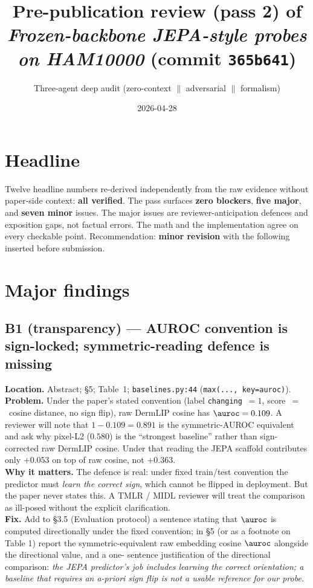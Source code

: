 \documentclass[11pt,a4paper]{article}
\title{Pre-publication review (pass 2) of \emph{Frozen-backbone JEPA-style
       probes on HAM10000} (commit \texttt{365b641})}
\author{Three-agent deep audit (zero-context $\parallel$ adversarial $\parallel$ formalism)}
\date{2026-04-28}
\begin{document}
\maketitle

\section*{Headline}

Twelve headline numbers re-derived independently from the raw evidence
without paper-side context: \textbf{all verified}. The pass surfaces
\textbf{zero blockers}, \textbf{five major}, and \textbf{seven minor}
issues. The major issues are reviewer-anticipation defences and
exposition gaps, not factual errors. The math and the implementation
agree on every checkable point. Recommendation: \textbf{minor revision}
with the following inserted before submission.

\section{Major findings}

\subsection*{B1 (transparency) --- AUROC convention is sign-locked;
            symmetric-reading defence is missing}

\textbf{Location.} Abstract; \S5; Table~1; \texttt{baselines.py:44}
(\texttt{max(...,~key=auroc)}).\\
\textbf{Problem.} Under the paper's stated convention (label
\texttt{changing}~$=1$, score~$=$~cosine distance, no sign flip), raw
DermLIP cosine has $\auroc = 0.109$. A reviewer will note that
$1 - 0.109 = 0.891$ is the symmetric-AUROC equivalent and ask why
pixel-L2 ($0.580$) is the ``strongest baseline'' rather than
sign-corrected raw DermLIP cosine. Under that reading the JEPA scaffold
contributes only $+0.053$ on top of raw cosine, not $+0.363$.\\
\textbf{Why it matters.} The defence is real: under fixed train/test
convention the predictor must \emph{learn the correct sign}, which
cannot be flipped in deployment. But the paper never states this. A
TMLR / MIDL reviewer will treat the comparison as ill-posed without
the explicit clarification.\\
\textbf{Fix.} Add to \S3.5 (Evaluation protocol) a sentence stating
that $\auroc$ is computed directionally under the fixed convention; in
\S5 (or as a footnote on Table 1) report the symmetric-equivalent raw
embedding cosine $\auroc$ alongside the directional value, and a one-
sentence justification of the directional comparison: \emph{the JEPA
predictor's job includes learning the correct orientation; a baseline
that requires an a-priori sign flip is not a usable reference for our
probe.}
\end{document}
